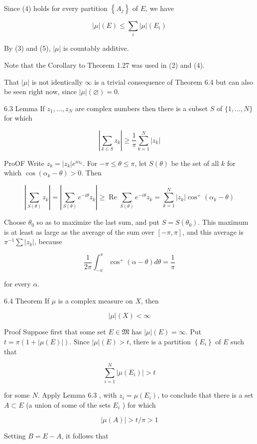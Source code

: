 \documentclass[10pt]{article}
\begin{document}
Since (4) holds for every partition $\left\{A_{j}\right\}$ of $E$, we have

$$
|\mu|(E) \leq \sum_{i}|\mu|\left(E_{i}\right)
$$

By (3) and (5), $|\mu|$ is countably additive.

Note that the Corollary to Theorem 1.27 was used in (2) and (4).

That $|\mu|$ is not identically $\infty$ is a trivial consequence of Theorem 6.4 but can also be seen right now, since $|\mu|(\varnothing)=0$.

6.3 Lemma If $z_{1}, \ldots, z_{N}$ are complex numbers then there is a subset $S$ of $\{1, \ldots, N\}$ for which

$$
\left|\sum_{k \in S} z_{k}\right| \geq \frac{1}{\pi} \sum_{k=1}^{N}\left|z_{k}\right|
$$

ProOF Write $z_{k}=\left|z_{k}\right| e^{i \alpha_{k}}$. For $-\pi \leq \theta \leq \pi$, let $S(\theta)$ be the set of all $k$ for which $\cos \left(\alpha_{k}-\theta\right)>0$. Then

$$
\left|\sum_{S(\theta)} z_{k}\right|=\left|\sum_{S(\theta)} e^{-i \theta} z_{k}\right| \geq \operatorname{Re} \sum_{S(\theta)} e^{-i \theta} z_{k}=\sum_{k=1}^{N}\left|z_{k}\right| \cos ^{+}\left(\alpha_{k}-\theta\right)
$$

Choose $\theta_{0}$ so as to maximize the last sum, and put $S=S\left(\theta_{0}\right)$. This maximum is at least as large as the average of the sum over $[-\pi, \pi]$, and this average is $\pi^{-1} \sum\left|z_{k}\right|$, because

$$
\frac{1}{2 \pi} \int_{-\pi}^{\pi} \cos ^{+}(\alpha-\theta) d \theta=\frac{1}{\pi}
$$

for every $\alpha$.

6.4 Theorem If $\mu$ is a complex measure on $X$, then

$$
|\mu|(X)<\infty
$$

Proof Suppose first that some set $E \in \mathfrak{M}$ has $|\mu|(E)=\infty$. Put $t=\pi(1+|\mu(E)|)$. Since $|\mu|(E)>t$, there is a partition $\left\{E_{i}\right\}$ of $E$ such that

$$
\sum_{i=1}^{N}\left|\mu\left(E_{i}\right)\right|>t
$$

for some $N$. Apply Lemma 6.3 , with $z_{i}=\mu\left(E_{i}\right)$, to conclude that there is a set $A \subset E$ (a union of some of the sets $E_{i}$ ) for which

$$
|\mu(A)|>t / \pi>1
$$

Setting $B=E-A$, it follows that
\end{document}
